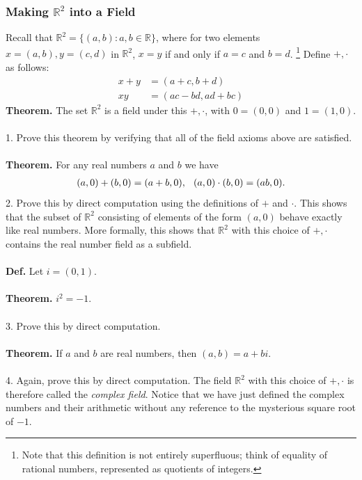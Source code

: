 \documentclass[12pt,letterpaper,reqno]{article}
\numberwithin{equation}{section}
\begin{document}
\subsubsection*{Making $\mathbb{R}^2$ into a Field}
Recall that $\mathbb{R}^2=\{(a,b):a,b \in \mathbb{R}\}$, where for two elements $x=(a,b), y=(c,d)$ in $\mathbb{R}^2$, $x=y$ if and only if $a=c$ and $b=d$. \footnote{Note that this definition is not entirely superfluous; think of equality of rational numbers, represented as quotients of integers.} Define $+, \cdot$ as follows:
\begin{align*}
	x+y&=(a+c,b+d) \\
	xy&=(ac-bd,ad+bc)
\end{align*}
{\bf Theorem.} The set $\mathbb{R}^2$ is a field under this $+,\cdot$, with $0=(0,0)$ and $1=(1,0)$. \\
\\
1. Prove this theorem by verifying that all of the field axioms above are satisfied. \\
\\
{\bf Theorem.} For any real numbers $a$ and $b$ we have
\begin{align*}
	(a,0)+(b,0)=(a+b,0), \hspace{0.25cm} (a,0)\cdot (b,0)=(ab,0).
\end{align*}
2. Prove this by direct computation using the definitions of $+$ and $\cdot$. This shows that the subset of $\mathbb{R}^2$ consisting of elements of the form $(a,0)$ behave exactly like real numbers. More formally, this shows that $\mathbb{R}^2$ with this choice of $+,\cdot$ contains the real number field as a subfield. \\
\\
{\bf Def.} Let $i=(0,1)$. \\
\\
{\bf Theorem.} $i^2=-1$. \\
\\
3. Prove this by direct computation.\\
\\
{\bf Theorem.} If $a$ and $b$ are real numbers, then $(a,b)=a+bi$. \\
\\
4. Again, prove this by direct computation. The field $\mathbb{R}^2$ with this choice of $+,\cdot$ is therefore called the \emph{complex field}. Notice that we have just defined the complex numbers and their arithmetic without any reference to the mysterious square root of $-1$.
\end{document}
